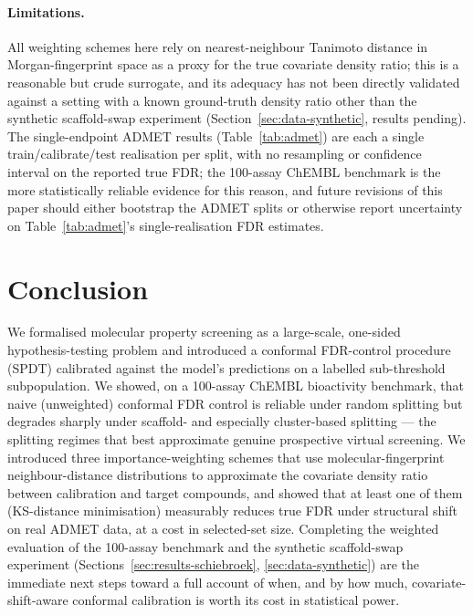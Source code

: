 \documentclass[11pt]{article}
\begin{document}
\paragraph{Limitations.} All weighting schemes here rely on nearest-neighbour
Tanimoto distance in Morgan-fingerprint space as a proxy for the true
covariate density ratio; this is a reasonable but crude surrogate, and its
adequacy has not been directly validated against a setting with a known
ground-truth density ratio other than the synthetic scaffold-swap experiment
(Section~\ref{sec:data-synthetic}, results pending). The single-endpoint
ADMET results (Table~\ref{tab:admet}) are each a single train/calibrate/test
realisation per split, with no resampling or confidence interval on the
reported true FDR; the 100-assay ChEMBL benchmark is the more statistically
reliable evidence for this reason, and future revisions of this paper should
either bootstrap the ADMET splits or otherwise report uncertainty on
Table~\ref{tab:admet}'s single-realisation FDR estimates.

\section{Conclusion}

We formalised molecular property screening as a large-scale, one-sided
hypothesis-testing problem and introduced a conformal FDR-control procedure
(SPDT) calibrated against the model's predictions on a labelled sub-threshold
subpopulation. We showed, on a 100-assay ChEMBL bioactivity benchmark, that
naive (unweighted) conformal FDR control is reliable under random splitting
but degrades sharply under scaffold- and especially cluster-based splitting
--- the splitting regimes that best approximate genuine prospective virtual
screening. We introduced three importance-weighting schemes that use
molecular-fingerprint neighbour-distance distributions to approximate the
covariate density ratio between calibration and target compounds, and showed
that at least one of them (KS-distance minimisation) measurably reduces true
FDR under structural shift on real ADMET data, at a cost in selected-set
size. Completing the weighted evaluation of the 100-assay benchmark and the
synthetic scaffold-swap experiment (Sections~\ref{sec:results-schiebroek},
\ref{sec:data-synthetic}) are the immediate next steps toward a full
account of when, and by how much, covariate-shift-aware conformal
calibration is worth its cost in statistical power.
\end{document}
